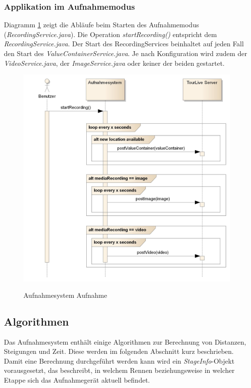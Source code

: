 \subsubsection{Applikation im Aufnahmemodus}
Diagramm \ref{fig:recording} zeigt die Abläufe beim Starten des Aufnahmemodus (\textit{RecordingService.java}). Die Operation \textit{startRecording()} entspricht dem \textit{RecordingService.java}. Der Start des RecordingServices beinhaltet auf jeden Fall den Start des  \textit{ValueContainerService.java}. Je nach Konfiguration wird zudem der \textit{VideoService.java}, der \textit{ImageService.java} oder keiner der beiden gestartet.

\begin{figure}[H]
	\centering
	\includegraphics[width=130mm]{images/android/recording.jpg}
	\label{fig:recording}
	\caption{Aufnahmesystem Aufnahme}
\end{figure}

\subsection{Algorithmen}
Das Aufnahmesystem enthält einige Algorithmen zur Berechnung von Distanzen, Steigungen und Zeit. Diese werden im folgenden Abschnitt kurz beschrieben. Damit eine Berechnung durchgeführt werden kann wird ein \textit{StageInfo}-Objekt vorausgesetzt, das beschreibt, in welchem Rennen beziehungsweise in welcher Etappe sich das Aufnahmegerät aktuell befindet.
\\


